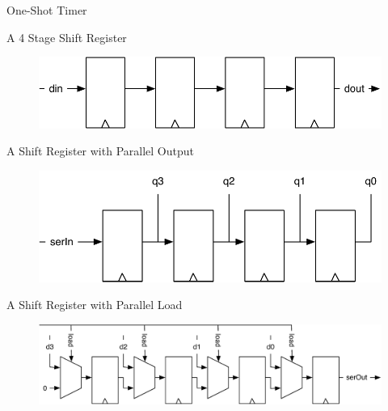 \begin{frame}[fragile]{One-Shot Timer}
\end{frame}

\begin{frame}[fragile]{A 4 Stage Shift Register}
\begin{figure}
  \includegraphics[scale=\scale]{../figures/shiftregister}
\end{figure}
\end{frame}


\begin{frame}[fragile]{A Shift Register with Parallel Output}
\begin{figure}
  \includegraphics[scale=\scale]{../figures/shiftreg-paraout}
\end{figure}
\end{frame}

\begin{frame}[fragile]{A Shift Register with Parallel Load}
\begin{figure}
  \includegraphics[scale=0.5]{../figures/shiftreg-paraload}
\end{figure}
\end{frame}


